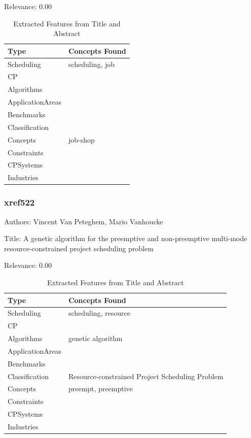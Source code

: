 Relevance:  0.00

{\scriptsize
\begin{longtable}{p{2cm}p{20cm}}
\caption{Extracted Features from Title and Abstract}\\ \toprule
Type & Concepts Found\\ \midrule
\endhead
\bottomrule
\endfoot
Scheduling & scheduling, job\\ 
CP & \\ 
Algorithms & \\ 
ApplicationAreas & \\ 
Benchmarks & \\ 
Classification & \\ 
Concepts & job-shop\\ 
Constraints & \\ 
CPSystems & \\ 
Industries & \\ 
\end{longtable}
}



\subsubsection{xref522}
\label{mw:xref522}

Authors: Vincent Van Peteghem, Mario Vanhoucke

Title: A genetic algorithm for the preemptive and non-preemptive multi-mode resource-constrained project scheduling problem

Relevance:  0.00

{\scriptsize
\begin{longtable}{p{2cm}p{20cm}}
\caption{Extracted Features from Title and Abstract}\\ \toprule
Type & Concepts Found\\ \midrule
\endhead
\bottomrule
\endfoot
Scheduling & scheduling, resource\\ 
CP & \\ 
Algorithms & genetic algorithm\\ 
ApplicationAreas & \\ 
Benchmarks & \\ 
Classification & Resource-constrained Project Scheduling Problem\\ 
Concepts & preempt, preemptive\\ 
Constraints & \\ 
CPSystems & \\ 
Industries & \\ 
\end{longtable}
}



